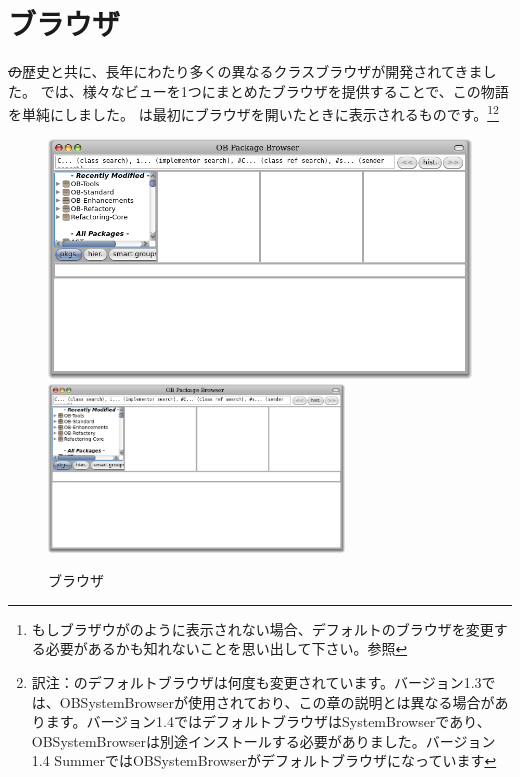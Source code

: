 \documentclass[a4paper,10pt,twoside]{book}
\begin{document}
\section{ブラウザ}

\st の歴史と共に、長年にわたり多くの異なるクラスブラウザが開発されてきました。
\pharo では、様々なビューを1つにまとめたブラウザを提供することで、この物語を単純にしました。
は最初にブラウザを開いたときに表示されるものです。\footnote{もしブラザウがのように表示されない場合、デフォルトのブラウザを変更する必要があるかも知れないことを思い出して下さい。参照}\footnote{訳注：\pharo のデフォルトブラウザは何度も変更されています。バージョン1.3では、OBSystemBrowserが使用されており、この章の説明とは異なる場合があります。バージョン1.4ではデフォルトブラウザはSystemBrowserであり、OBSystemBrowserは別途インストールする必要がありました。バージョン1.4 SummerではOBSystemBrowserがデフォルトブラウザになっています}

\begin{figure}[htbp]
   \centering
   \ifluluelse
{\includegraphics[width=\textwidth]{SystemBrowser0} }
{\includegraphics[width=0.7\textwidth]{SystemBrowser0} }
   \caption{ブラウザ}
\end{figure}
\end{document}
